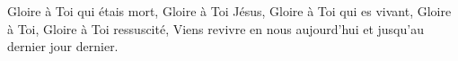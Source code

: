 Gloire à Toi qui étais mort,
Gloire à Toi Jésus,
Gloire à Toi qui es vivant,
Gloire à Toi, Gloire à Toi ressuscité,
Viens revivre en nous aujourd’hui et jusqu’au dernier jour dernier.
